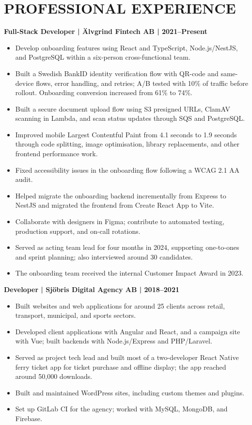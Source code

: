\documentclass[11pt,a4paper]{article}
\begin{document}
\section*{PROFESSIONAL EXPERIENCE}
\textbf{Full-Stack Developer | Älvgrind Fintech AB | 2021–Present}
\begin{itemize}
\item Develop onboarding features using React and TypeScript, Node.js/NestJS, and PostgreSQL within a six-person cross-functional team.
\item Built a Swedish BankID identity verification flow with QR-code and same-device flows, error handling, and retries; A/B tested with 10\% of traffic before rollout. Onboarding conversion increased from 61\% to 74\%.
\item Built a secure document upload flow using S3 presigned URLs, ClamAV scanning in Lambda, and scan status updates through SQS and PostgreSQL.
\item Improved mobile Largest Contentful Paint from 4.1 seconds to 1.9 seconds through code splitting, image optimisation, library replacements, and other frontend performance work.
\item Fixed accessibility issues in the onboarding flow following a WCAG 2.1 AA audit.
\item Helped migrate the onboarding backend incrementally from Express to NestJS and migrated the frontend from Create React App to Vite.
\item Collaborate with designers in Figma; contribute to automated testing, production support, and on-call rotations.
\item Served as acting team lead for four months in 2024, supporting one-to-ones and sprint planning; also interviewed around 30 candidates.
\item The onboarding team received the internal Customer Impact Award in 2023.
\end{itemize}

\textbf{Developer | Sjöbris Digital Agency AB | 2018–2021}
\begin{itemize}
\item Built websites and web applications for around 25 clients across retail, transport, municipal, and sports sectors.
\item Developed client applications with Angular and React, and a campaign site with Vue; built backends with Node.js/Express and PHP/Laravel.
\item Served as project tech lead and built most of a two-developer React Native ferry ticket app for ticket purchase and offline display; the app reached around 50,000 downloads.
\item Built and maintained WordPress sites, including custom themes and plugins.
\item Set up GitLab CI for the agency; worked with MySQL, MongoDB, and Firebase.
\end{itemize}
\end{document}
